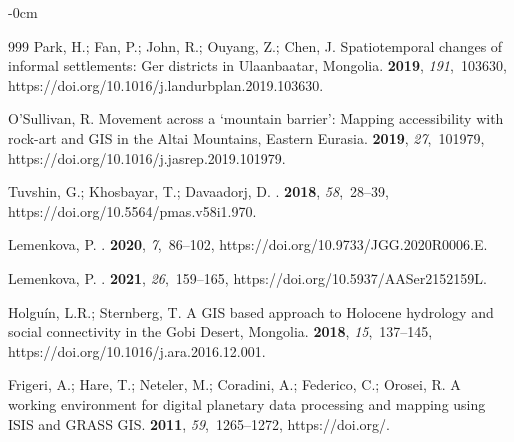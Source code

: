 \documentclass[geosciences,article,accept,pdftex,oneauthor]{Definitions/mdpi}
\begin{document}
\begin{adjustwidth}{-\extralength}{0cm}
\begin{thebibliography}{999}
Park, H.; Fan, P.; John, R.; Ouyang, Z.; Chen, J.
\newblock Spatiotemporal changes of informal settlements: Ger districts in
  Ulaanbaatar, Mongolia.
 {\bf 2019}, {\em 191},~103630, https://doi.org/10.1016/j.landurbplan.2019.103630.

O'Sullivan, R.
\newblock Movement across a ‘mountain barrier’: Mapping accessibility with
  rock-art and GIS in the Altai Mountains, Eastern Eurasia.
 {\bf 2019}, {\em
  27},~101979, https://doi.org/10.1016/j.jasrep.2019.101979.

Tuvshin, G.; Khosbayar, T.; Davaadorj, D.
.
 {\bf 2018},
  {\em 58},~28--39, https://doi.org/10.5564/pmas.v58i1.970.

Lemenkova, P.
.
 {\bf 2020}, {\em
  7},~86--102, https://doi.org/10.9733/JGG.2020R0006.E.

Lemenkova, P.
.
 {\bf 2021}, {\em 26},~159--165, https://doi.org/10.5937/AASer2152159L.

Holguín, L.R.; Sternberg, T.
\newblock A GIS based approach to Holocene hydrology and social connectivity in
  the Gobi Desert, Mongolia.
 {\bf 2018}, {\em 15},~137--145, https://doi.org/10.1016/j.ara.2016.12.001.

Frigeri, A.; Hare, T.; Neteler, M.; Coradini, A.; Federico, C.; Orosei, R.
\newblock A working environment for digital planetary data processing and
  mapping using ISIS and GRASS GIS.
 {\bf 2011}, {\em 59},~1265--1272,
  https://doi.org/{\href{https://doi.org/10.1016/j.pss.2010.12.008}{}}.


\end{thebibliography}
\end{adjustwidth}
\end{document}
